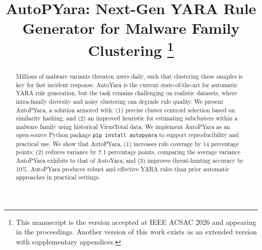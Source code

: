 \documentclass[conference,compsoc,letterpaper]{IEEEtran}
\begin{document}
%
\title{AutoPYara: Next-Gen YARA Rule Generator for Malware Family Clustering%
\thanks{This manuscript is the version accepted at IEEE ACSAC 2026 and appearing in the proceedings. Another version of this work exists as an extended version with supplementary appendices.}}

\author{

}





\maketitle

\begin{abstract}
Millions of malware variants threaten users daily, such that clustering these samples is key for fast incident response. AutoYara is the current state-of-the-art for automatic YARA rule generation, but the task remains challenging on realistic datasets, where intra-family diversity and noisy clustering can degrade rule quality. We present AutoPYara, a solution armored with: (1) precise cluster centroid selection based on similarity hashing, and (2) an improved heuristic for estimating subclusters within a malware family using historical VirusTotal data. We implement AutoPYara as an open-source Python package \texttt{pip install autopyara} to support reproducibility and practical use. We show that AutoPYara, (1) increases rule coverage by 14 percentage points; (2) reduces variance by 7.1 percentage points, comparing the average variance AutoPYara exhibits to that of AutoYara; and (3) improves threat-hunting accuracy by 10\%. AutoPYara produces robust and effective YARA rules than prior automatic approaches in practical settings.

\end{abstract}
\end{document}
